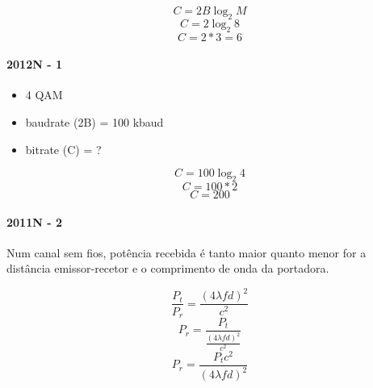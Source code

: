 \documentclass[../resumosRCOM.tex]{subfiles}
\begin{document}
\[C = 2B\log_2 M\]
\[C = 2\log_2 8\]
\[C = 2*3 = 6\]

\paragraph{2012N - 1}
\begin{itemize}
    \item 4 QAM
    \item baudrate (2B) = 100 kbaud
    \item bitrate (C) = ?
\end{itemize}

\[C = 100\log_2 4\]
\[C = 100*2\]
\[C = 200\]

\paragraph{2011N - 2}
Num canal sem fios, potência recebida é tanto maior quanto menor for a distância emissor-recetor e o comprimento de onda
da portadora.

\[\frac{P_t}{P_r}=\frac{(4\lambda fd)^2}{c^2}\]
\[P_r=\frac{P_t}{\frac{(4\lambda fd)^2}{c^2}}\]
\[P_r=\frac{P_tc^2}{(4\lambda fd)^2}\]
\end{document}

